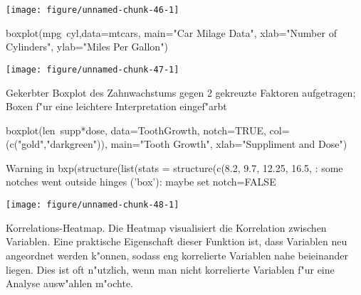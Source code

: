\documentclass[a4paper,twoside]{tufte-book}\usepackage[]{graphicx}\usepackage[]{color}
\makeatletter
\def\maxwidth{ %
  \ifdim\Gin@nat@width>\linewidth
    \linewidth
  \else
    \Gin@nat@width
  \fi
}
\makeatother
\begin{document}
\begin{appendices}
\begin{Schunk}
{\centering \texttt{[image: figure/unnamed-chunk-46-1]} 

}

\end{Schunk}



\begin{Schunk}
\begin{Sinput}
boxplot(mpg~cyl,data=mtcars, main="Car Milage Data", 
   xlab="Number of Cylinders", ylab="Miles Per Gallon")
\end{Sinput}


{\centering \texttt{[image: figure/unnamed-chunk-47-1]} 

}

\end{Schunk}

Gekerbter Boxplot des Zahnwachstums gegen 2 gekreuzte Faktoren aufgetragen;
Boxen f"ur eine leichtere Interpretation eingef"arbt

\begin{Schunk}
\begin{Sinput}
boxplot(len~supp*dose, data=ToothGrowth, notch=TRUE, 
  col=(c("gold","darkgreen")),
  main="Tooth Growth", xlab="Suppliment and Dose")
\end{Sinput}
\begin{Soutput}
Warning in bxp(structure(list(stats = structure(c(8.2, 9.7, 12.25, 16.5, : some notches went outside hinges ('box'): maybe set notch=FALSE
\end{Soutput}


{\centering \texttt{[image: figure/unnamed-chunk-48-1]} 

}

\end{Schunk}



Korrelations-Heatmap. Die Heatmap visualisiert die Korrelation zwischen Variablen. Eine praktische Eigenschaft dieser Funktion ist, dass Variablen neu angeordnet werden k"onnen, sodass eng korrelierte Variablen nahe beieinander liegen. Dies ist oft n"utzlich, wenn man nicht korrelierte Variablen f"ur eine Analyse ausw"ahlen m"ochte.


\end{appendices}
\end{document}
